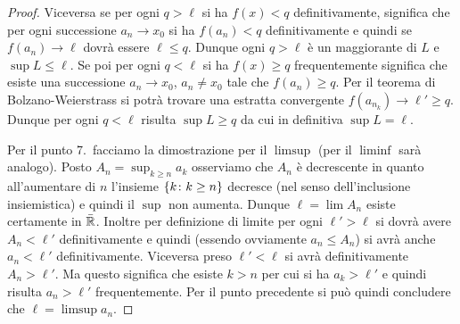 \begin{proof}
  Viceversa se per ogni $q>\ell$ si ha $f(x)<q$ definitivamente,
  significa che per ogni successione $a_n\to x_0$ si ha
  $f(a_n) < q$ definitivamente e quindi se $f(a_n)\to \ell$
  dovrà essere $\ell\le q$. 
  Dunque ogni $q>\ell$ è un maggiorante di $L$ e $\sup L\le \ell$.
  Se poi per ogni $q<\ell$ si ha $f(x)\ge q$ frequentemente
  significa che esiste una successione $a_n\to x_0$, $a_n\neq x_0$ 
  tale che $f(a_n)\ge q$. 
  Per il teorema di Bolzano-Weierstrass si potrà trovare 
  una estratta convergente $f(a_{n_k})\to \ell'\ge q$.
  Dunque per ogni $q<\ell$ risulta
  $\sup L \ge q$ da cui in definitiva $\sup L = \ell$. 

  Per il punto 7.\ facciamo la dimostrazione per il $\limsup$ (per il $\liminf$
  sarà analogo).
  Posto $A_n = \sup_{k\ge n} a_k$ osserviamo che $A_n$ è decrescente
  in quanto all'aumentare di $n$ l'insieme
  ${\left\{ k\colon k \ge n \right\}}$ decresce (nel senso dell'inclusione insiemistica)
  e quindi
  il $\sup$ non aumenta.
  Dunque $\ell=\lim A_n$ esiste certamente in $\bar {{\mathbb R}}$.
  Inoltre per definizione di limite per ogni $\ell'>\ell$
  si dovrà avere $A_n < \ell'$ definitivamente e quindi
  (essendo ovviamente $a_n \le A_n$) si avrà
  anche $a_n < \ell'$ definitivamente.
  Viceversa preso $\ell'<\ell$ si avrà definitivamente
  $A_n > \ell'$. Ma questo significa che esiste $k>n$
  per cui si ha $a_k > \ell'$ e quindi
  risulta $a_n > \ell'$ frequentemente.
  Per il punto precedente si può quindi concludere che
  $\ell = \limsup a_n$.
\end{proof}

